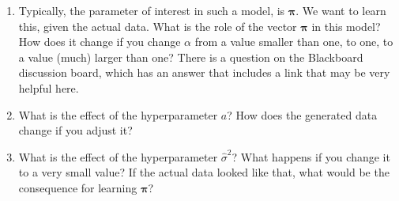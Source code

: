 \documentclass[a4paper]{article}
\renewcommand{\v}[1]{\mathbf{\bm #1}}
\begin{document}
\begin{enumerate}
    \item Typically, the parameter of interest in such a model, is $\v{\pi}$. We want to learn this, given the actual data. What is the role of the vector $\v{\pi}$ in this model? How does it change if you change $\alpha$ from a value smaller than one, to one, to a value (much) larger than one? There is a question on the Blackboard discussion board, which has an answer that includes a link that may be very helpful here.
    \item What is the effect of the hyperparameter $a$? How does the generated data change if you adjust it?
    \item What is the effect of the hyperparameter $\hat{\sigma}^2$? What happens if you change it to a very small value? If the actual data looked like that, what would be the consequence for learning $\v{\pi}$?
\end{enumerate}
\end{document}
